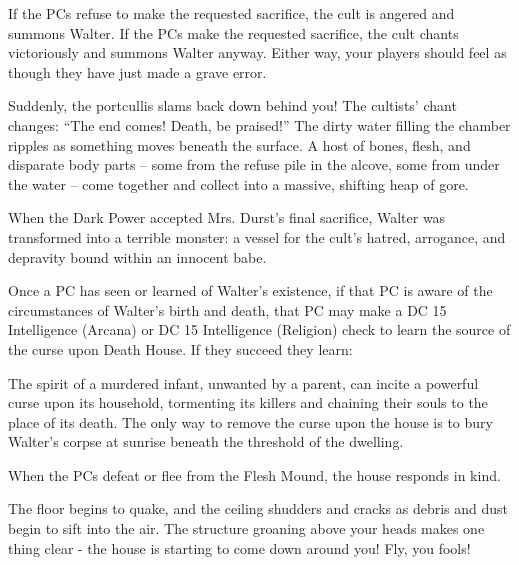 If the PCs refuse to make the requested sacrifice, the cult is angered and summons Walter. If the PCs make the
requested sacrifice, the cult chants victoriously and summons Walter anyway. Either way, your players should
feel as though they have just made a grave error.
\begin{readout}
  Suddenly, the portcullis slams back down behind you! The cultists' chant changes: ``The end comes! Death, be
  praised!'' The dirty water filling the chamber ripples as something moves beneath the surface.
  A host of bones, flesh, and disparate body parts -- some from the refuse pile in the alcove, some from
  under the water -- come together and collect into a massive, shifting heap of gore.
\end{readout}
When the Dark Power accepted Mrs. Durst's final sacrifice, Walter was transformed into a terrible monster: a 
vessel for the cult's hatred, arrogance, and depravity bound within an innocent babe.

Once a PC has seen or learned of Walter's existence, if that PC is aware of the circumstances of Walter's birth
and death, that PC may make a DC 15 Intelligence (Arcana) or DC 15 Intelligence (Religion) check to learn the
source of the curse upon Death House. If they succeed they learn:
\begin{readout}
  The spirit of a murdered infant, unwanted by a parent, can incite a powerful curse upon its household, 
  tormenting its killers and chaining their souls to the place of its death. The only way to remove the curse
  upon the house is to bury Walter's corpse at sunrise beneath the threshold of the dwelling.
\end{readout}
When the PCs defeat or flee from the Flesh Mound, the house responds in kind.
\begin{readout}
  The floor begins to quake, and the ceiling shudders and cracks as debris and dust begin to sift into the air.
  The structure groaning above your heads makes one thing clear - the house is starting to come down around you!
  Fly, you fools!
\end{readout}

\begin{arealinks}
  \item {}
\end{arealinks}

